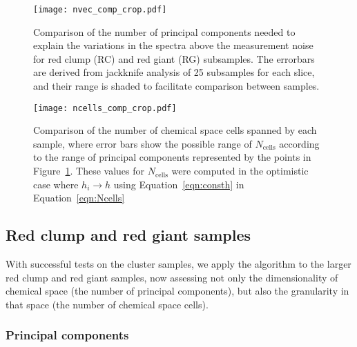 \documentclass[a4paper,fleqn,usenatbib]{mnras}
\begin{document}
\begin{figure}
\centering
\texttt{[image: nvec\_comp\_crop.pdf]}
\caption{Comparison of the number of principal components needed to explain the variations in the spectra above the measurement noise for red clump (RC) and red giant (RG) subsamples. The errorbars are derived from jackknife analysis of 25 subsamples for each slice, and their range is shaded to facilitate comparison between samples.}
\label{fig:samplesnvec}
\end{figure}

\begin{figure}
\centering
\texttt{[image: ncells\_comp\_crop.pdf]}
\caption{Comparison of the number of chemical space cells spanned by each sample, where error bars show the possible range of $N_{\mathrm{cells}}$ according to the range of principal components represented by the points in Figure~\ref{fig:samplesnvec}. These values for $N_{\mathrm{cells}}$ were computed in the optimistic case where $h_i \rightarrow h$ using Equation~\eqref{eqn:consth} in Equation~\eqref{eqn:Ncells}}
\label{fig:samplesncells}
\end{figure}


\subsection{Red clump and red giant samples}
\label{sec:RC}

With successful tests on the cluster samples, we apply the algorithm to the larger red clump and red giant samples, now assessing not only the dimensionality of chemical space (the number of principal components), but also the granularity in that space (the number of chemical space cells). 

\subsubsection{Principal components}
\end{document}

